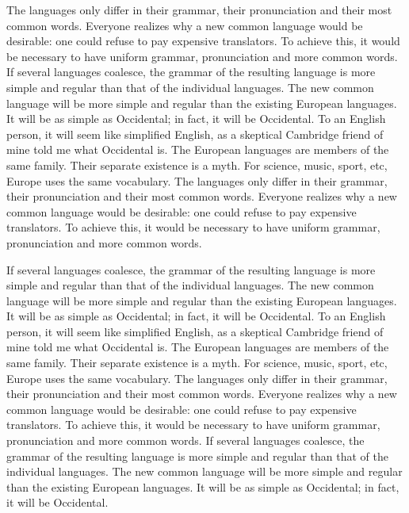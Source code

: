 The languages only differ in their grammar, their pronunciation and their most common words. Everyone realizes why a new common language would be desirable: one could refuse to pay expensive translators. To achieve this, it would be necessary to have uniform grammar, pronunciation and more common words. If several languages coalesce, the grammar of the resulting language is more simple and regular than that of the individual languages. The new common language will be more simple and regular than the existing European languages. It will be as simple as Occidental; in fact, it will be Occidental. To an English person, it will seem like simplified English, as a skeptical Cambridge friend of mine told me what Occidental is. The European languages are members of the same family. Their separate existence is a myth. For science, music, sport, etc, Europe uses the same vocabulary. The languages only differ in their grammar, their pronunciation and their most common words. Everyone realizes why a new common language would be desirable: one could refuse to pay expensive translators. To achieve this, it would be necessary to have uniform grammar, pronunciation and more common words.

If several languages coalesce, the grammar of the resulting language is more simple and regular than that of the individual languages. The new common language will be more simple and regular than the existing European languages. It will be as simple as Occidental; in fact, it will be Occidental. To an English person, it will seem like simplified English, as a skeptical Cambridge friend of mine told me what Occidental is. The European languages are members of the same family. Their separate existence is a myth. For science, music, sport, etc, Europe uses the same vocabulary. The languages only differ in their grammar, their pronunciation and their most common words. Everyone realizes why a new common language would be desirable: one could refuse to pay expensive translators. To achieve this, it would be necessary to have uniform grammar, pronunciation and more common words. If several languages coalesce, the grammar of the resulting language is more simple and regular than that of the individual languages. The new common language will be more simple and regular than the existing European languages. It will be as simple as Occidental; in fact, it will be Occidental.

